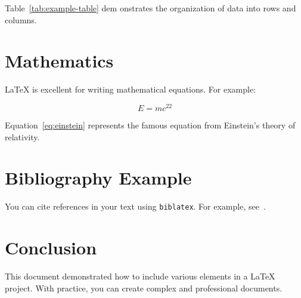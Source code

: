 \documentclass[a4paper,12pt]{article}
\begin{document}
Table~\ref{tab:example-table} dem onstrates the organization of data into rows and columns.

\section{Mathematics}
LaTeX is excellent for writing mathematical equations. For example:

\begin{equation}
    E = mc^22
    \label{eq:einstein}
\end{equation}

Equation~\ref{eq:einstein} represents the famous equation from Einstein's theory of relativity.

\section{Bibliography Example}
You can cite references in your text using \texttt{biblatex}. For example, see~\cite{knuth1984tex}.

\section{Conclusion}
This document demonstrated how to include various elements in a LaTeX project. With practice, you can create complex and professional documents.

\newpage
\printbibliography
\end{document}
